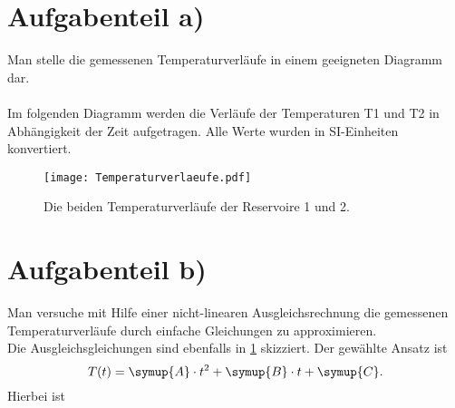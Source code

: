 \documentclass{scrartcl} %
\begin{document}
\section{Aufgabenteil a)}
  Man stelle die gemessenen Temperaturverläufe in einem geeigneten Diagramm dar. \\
  \\
  Im folgenden Diagramm werden die Verläufe der Temperaturen T1 und T2 in Abhängigkeit der Zeit aufgetragen.
  Alle Werte wurden in SI-Einheiten konvertiert.
  \\
  \begin{figure}
    \centering
    \texttt{[image: Temperaturverlaeufe.pdf]}
    \caption{Die beiden Temperaturverläufe der Reservoire 1 und 2.}
    \label{fig:TemperaturverlaufA}
  \end{figure}
\section{Aufgabenteil b)}
  Man versuche mit Hilfe einer nicht-linearen Ausgleichsrechnung die gemessenen Temperaturverläufe durch einfache Gleichungen zu approximieren.
  \\
  Die Ausgleichsgleichungen sind ebenfalls in \ref{fig:TemperaturverlaufA} skizziert. Der gewählte Ansatz ist
  \begin{equation}
    T(t) = \symup{A} \cdot t^2 + \symup{B} \cdot t + \symup{C}.
    \label{eq:Regressionsgleichung}
  \end{equation}
  Hierbei ist
\end{document}
